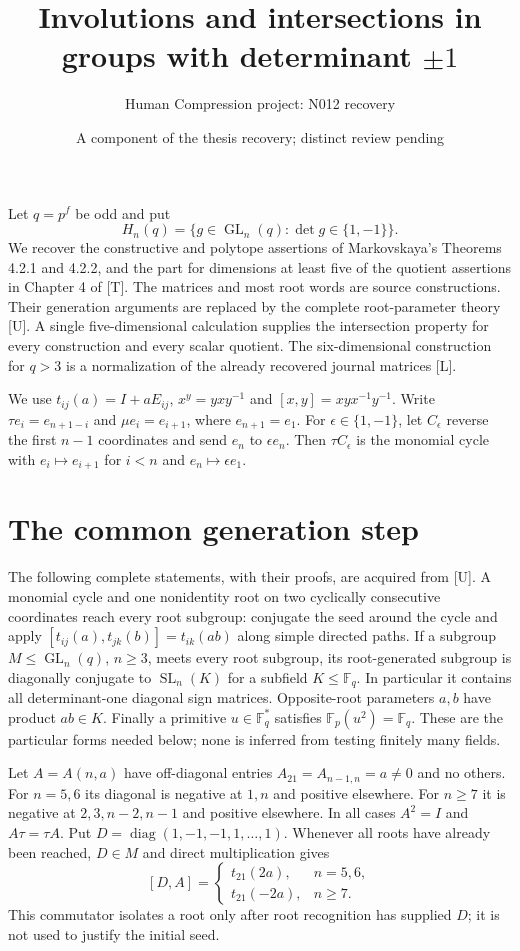 \documentclass[11pt,a4paper]{article}
\title{Involutions and intersections in groups with determinant $\pm1$}
\author{Human Compression project: N012 recovery}
\date{A component of the thesis recovery; distinct review pending}
\newcommand{\GL}{\operatorname{GL}}
\newcommand{\SL}{\operatorname{SL}}
\newcommand{\diag}{\operatorname{diag}}
\newcommand{\F}{\mathbb F}
\begin{document}
\maketitle

Let $q=p^f$ be odd and put
\[
 H_n(q)=\{g\in\GL_n(q):\det g\in\{1,-1\}\}.
\]
We recover the constructive and polytope assertions of Markovskaya's
Theorems 4.2.1 and 4.2.2, and the part for dimensions at least five of the
quotient assertions in Chapter 4 of [T]. The matrices and most root words
are source constructions. Their generation arguments are replaced by
the complete root-parameter theory [U]. A single five-dimensional
calculation supplies the intersection property for every construction
and every scalar quotient. The six-dimensional construction for $q>3$
is a normalization of the already recovered journal matrices [L].

We use $t_{ij}(a)=I+aE_{ij}$, $x^y=yxy^{-1}$ and
$[x,y]=xyx^{-1}y^{-1}$. Write $\tau e_i=e_{n+1-i}$ and
$\mu e_i=e_{i+1}$, where $e_{n+1}=e_1$. For $\epsilon\in\{1,-1\}$,
let $C_\epsilon$ reverse the first $n-1$ coordinates and send
$e_n$ to $\epsilon e_n$. Then $\tau C_\epsilon$ is the monomial
cycle with $e_i\mapsto e_{i+1}$ for $i<n$ and
$e_n\mapsto\epsilon e_1$.

\section{The common generation step}
The following complete statements, with their proofs, are acquired
from [U]. A monomial cycle and one nonidentity root on two cyclically
consecutive coordinates reach every root subgroup: conjugate the seed
around the cycle and apply
$[t_{ij}(a),t_{jk}(b)]=t_{ik}(ab)$ along simple directed paths.
If a subgroup $M\le\GL_n(q)$, $n\ge3$, meets every root subgroup,
its root-generated subgroup is diagonally conjugate to $\SL_n(K)$
for a subfield $K\le\F_q$. In particular it contains all
determinant-one diagonal sign matrices. Opposite-root parameters
$a,b$ have product $ab\in K$. Finally a primitive $u\in\F_q^*$
satisfies $\F_p(u^2)=\F_q$. These are the particular forms needed
below; none is inferred from testing finitely many fields.

Let $A=A(n,a)$ have off-diagonal entries
$A_{21}=A_{n-1,n}=a\ne0$ and no others. For $n=5,6$ its diagonal
is negative at $1,n$ and positive elsewhere. For $n\ge7$ it is
negative at $2,3,n-2,n-1$ and positive elsewhere.
In all cases $A^2=I$ and $A\tau=\tau A$.
Put $D=\diag(1,-1,-1,1,\ldots,1)$. Whenever all roots have
already been reached, $D\in M$ and direct multiplication gives
\[
 [D,A]=\begin{cases}t_{21}(2a),&n=5,6,\\
                     t_{21}(-2a),&n\ge7.
        \end{cases}                                      \tag{1}
\]
This commutator isolates a root only after root recognition has
supplied $D$; it is not used to justify the initial seed.
\end{document}
